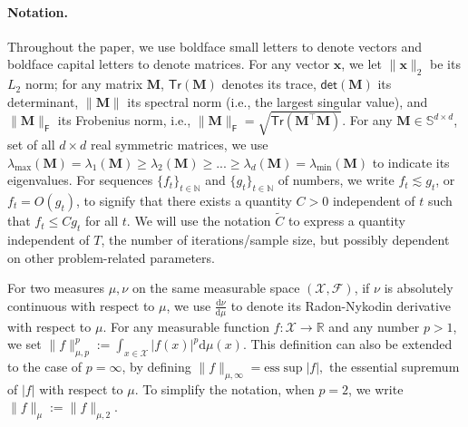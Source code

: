 \paragraph{Notation.}
Throughout the paper, we use boldface small letters to denote vectors and boldface capital letters to denote matrices. For any vector $\bm{x}$, we let $\|\bm{x}\|_2$ be its $L_2$ norm; for any matrix $\bm{M}$, $\mathsf{Tr}(\bm{M})$ denotes its trace, $\mathsf{det}(\bm{M})$ its determinant, $\|\bm{M}\|$ its spectral norm (i.e., the largest singular value), and $\|\bm{M}\|_{\mathsf{F}}$ its Frobenius norm, i.e., $\|\bm{M}\|_{\mathsf{F}}=\sqrt{\mathsf{Tr}(\bm{M}^\top \bm{M})}$.  For any $\bm{M} \in \mathbb{S}^{d \times d}$, set of all $d \times d$ real symmetric matrices, we use $\lambda_{\max}(\bm{M}) = \lambda_1(\bm{M}) \geq \lambda_2(\bm{M}) \geq ... \geq \lambda_d(\bm{M}) = \lambda_{\min}(\bm{M})$ to indicate its eigenvalues.
For sequences $\{f_t\}_{t \in \mathbb{N}}$ and $\{g_t\}_{t \in \mathbb{N}}$ of numbers, we write $f_t \lesssim g_t$, or $f_t = O(g_t)$, to signify that there exists a quantity $C > 0$ independent of $t$ such that $f_t \leq C g_t$ for all $t$. We will use the notation $\tilde{C}$ to express a quantity independent of $T$, the number of iterations/sample size, but possibly dependent on other problem-related parameters. 

For two measures $\mu,\nu$ on the same measurable space $(\mathcal{X},\mathscr{F})$, if $\nu$ is absolutely continuous with respect to $\mu$, we use $\frac{\mathrm{d}\nu}{\mathrm{d}\mu}$ to denote its Radon-Nykodin derivative with respect to $\mu$. %
For any measurable function $f: \mathcal{X} \to \mathbb{R}$ and any number $p > 1$, we set $\|f\|_{\mu,p}^p:=\int_{x \in \mathcal{X}}|f(x)|^p \mathrm{d}\mu(x)$.
This definition can also be extended to the case of $p = \infty$, by defining $\|f\|_{\mu,\infty} = \text{ess} \sup |f|,$ the essential supremum of $|f|$ with respect to $\mu$. To simplify the notation, when $p = 2$, we write $\|f\|_{\mu}:=\|f\|_{\mu,2}$.

